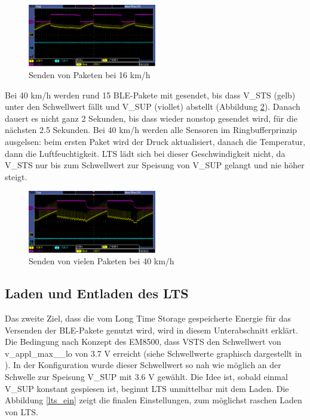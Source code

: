\begin{figure}[ht]
   \includegraphics[width=0.5\textwidth]{4Resultate/imag/pic2.PNG}
    \caption{Senden von Paketen bei 16 km/h}
    \label{paket_16kmh}
\end{figure}

Bei 40 km/h werden rund 15 BLE-Pakete mit gesendet, bis dass V\_STS (gelb) unter den Schwellwert fällt und V\_SUP (viollet) abstellt (Abbildung \ref{paket_40kmh}). Danach dauert es nicht ganz 2 Sekunden, bis dass wieder nonstop gesendet wird, für die nächsten 2.5 Sekunden. Bei 40 km/h werden alle Sensoren im Ringbufferprinzip ausgelsen: beim ersten Paket wird der Druck aktualisiert, danach die Temperatur, dann die Luftfeuchtigkeit. LTS lädt sich bei dieser Geschwindigkeit nicht, da V\_STS nur bis zum Schwellwert zur Speisung von V\_SUP gelangt und nie höher steigt.


\begin{figure}[ht]
   \includegraphics[width=0.5\textwidth]{4Resultate/imag/pic4.PNG}
    \caption{Senden von vielen Paketen bei 40 km/h}
    \label{paket_40kmh}
\end{figure}


\subsection{Laden und Entladen des LTS}
\label{res_entladen}

Das zweite Ziel, dass die vom Long Time Storage gespeicherte Energie für das Versenden der BLE-Pakete genutzt wird, wird in diesem Unterabschnitt erklärt. Die Bedingung nach Konzept des EM8500, dass VSTS den Schwellwert von v\_appl\_max\_\_lo von 3.7 V erreicht (siehe Schwellwerte graphisch dargestellt in ). In der Konfiguration wurde dieser Schwellwert so nah wie möglich an der Schwelle zur Speisung V\_SUP mit 3.6 V gewählt. Die Idee ist, sobald einmal V\_SUP konstant gespiesen ist, beginnt LTS unmittelbar mit dem Laden. Die Abbildung \ref{lts_ein} zeigt die finalen Einstellungen, zum  möglichst raschen Laden von LTS.

